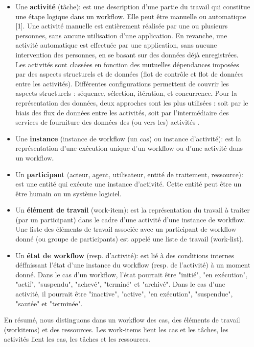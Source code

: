  \begin{itemize}
 \item Une \textbf{activité} (tâche): est une description d'une partie du travail qui constitue une étape logique dans un workflow. Elle peut être manuelle ou automatique [1]. Une activité manuelle est entièrement réalisée par une ou plusieurs personnes, sans aucune utilisation d'une application. En revanche, une activité automatique est effectuée par une application, sans aucune intervention des personnes, en se basant sur des données déjà enregistrées. Les activités sont classées en fonction des mutuelles dépendances imposées par des aspects structurels et de données (flot de contrôle et flot de données entre les activités). Différentes configurations permettent de couvrir les aspects structurels : séquence, sélection, itération, et concurrence. Pour la représentation des données, deux approches sont les plus utilisées : soit par le biais des flux de données entre les activités, soit par l'intermédiaire des services de fourniture des données des (ou vers les) activités .
\item Une \textbf{instance }(instance de workflow (un cas) ou instance d'activité): est la représentation d'une exécution unique d'un workflow ou d'une activité dans un workflow.

\item Un \textbf{ participant} (acteur, agent, utilisateur, entité de traitement, ressource): est une entité qui exécute une instance d'activité. Cette entité peut être un être humain ou un système logiciel.
 \item Un \textbf{élément de travail} (work-item): est la représentation du travail à traiter (par un participant) dans le cadre d'une activité d'une instance de workflow. Une liste des éléments de travail associée avec un participant de workflow donné (ou groupe de participants) est appelé une liste de travail (work-list).
 \item  Un \textbf{état de workflow} (resp. d'activité): est lié à des conditions internes déffnissant l'état d'une instance du workflow (resp. de l'activité) à un moment donné. Dans le cas d'un workflow, l'état pourrait être "initié", "en exécution", "actif", "suspendu", "achevé", "terminé" et "archivé". Dans le cas d'une activité, il pourrait être "inactive", "active", "en exécution", "suspendue", "sautée" et "terminée". 
 \end{itemize}
En résumé, nous distinguons dans un workflow des cas, des éléments de travail (workitems) et des ressources. Les work-items lient les cas et les tâches, les activités lient les cas, les tâches et les ressources.
